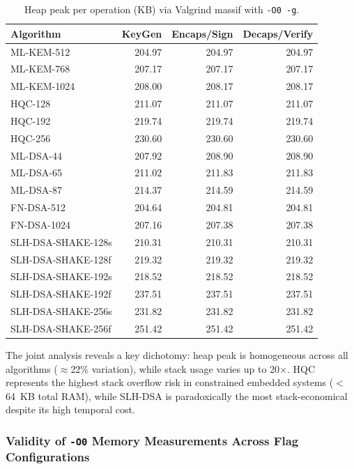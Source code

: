 \documentclass[12pt]{article}
\begin{document}
\begin{table}[htbp]
\centering
\caption{Heap peak per operation (KB) via Valgrind massif with \texttt{-O0 -g}.}
\label{tab:heap}
\small
\begin{tabular}{lrrr}
\hline
\textbf{Algorithm} & \textbf{KeyGen} & \textbf{Encaps/Sign} & \textbf{Decaps/Verify} \\
\hline
ML-KEM-512    & 204.97 & 204.97 & 204.97 \\
ML-KEM-768    & 207.17 & 207.17 & 207.17 \\
ML-KEM-1024   & 208.00 & 208.17 & 208.17 \\
HQC-128       & 211.07 & 211.07 & 211.07 \\
HQC-192       & 219.74 & 219.74 & 219.74 \\
HQC-256       & 230.60 & 230.60 & 230.60 \\
\hline
ML-DSA-44     & 207.92 & 208.90 & 208.90 \\
ML-DSA-65     & 211.02 & 211.83 & 211.83 \\
ML-DSA-87     & 214.37 & 214.59 & 214.59 \\
FN-DSA-512    & 204.64 & 204.81 & 204.81 \\
FN-DSA-1024   & 207.16 & 207.38 & 207.38 \\
SLH-DSA-SHAKE-128s & 210.31 & 210.31 & 210.31 \\
SLH-DSA-SHAKE-128f & 219.32 & 219.32 & 219.32 \\
SLH-DSA-SHAKE-192s & 218.52 & 218.52 & 218.52 \\
SLH-DSA-SHAKE-192f & 237.51 & 237.51 & 237.51 \\
SLH-DSA-SHAKE-256s & 231.82 & 231.82 & 231.82 \\
SLH-DSA-SHAKE-256f & 251.42 & 251.42 & 251.42 \\
\hline
\end{tabular}
\end{table}

The joint analysis reveals a key dichotomy: heap peak is homogeneous across
all algorithms ($\approx$22\% variation), while stack usage varies up to
20$\times$. HQC represents the highest stack overflow risk in constrained
embedded systems ($<$64~KB total RAM), while SLH-DSA is paradoxically the
most stack-economical despite its high temporal cost.

\subsubsection{Validity of \texttt{-O0} Memory Measurements Across Flag Configurations}
\label{subsec:flags-memoria}
\end{document}
